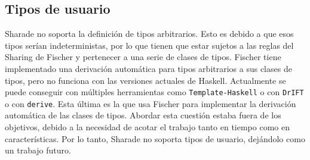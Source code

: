 \documentclass[class=article, crop=false]{standalone}
\begin{document}
\subsection{Tipos de usuario}

Sharade no soporta la definición de tipos arbitrarios. Esto es debido a que esos tipos serían
indeterministas, por lo que tienen que estar sujetos a las reglas del Sharing de Fischer y
pertenecer a una serie de clases de tipos. Fischer tiene implementado una derivación
automática para tipos arbitrarios a sus clases de tipos, pero no funciona con las versiones
actuales de Haskell. Actualmente se puede conseguir con múltiples herramientas como
\verb`Template-Haskell`\cite{sheard2002template} o con
\verb`DrIFT`\cite{DrIFT} o con \verb`derive`\cite{derive}. Esta última es la que usa Fischer
para implementar la derivación automática de las clases de tipos. Abordar esta cuestión
estaba fuera de los objetivos, debido a la necesidad de acotar el trabajo tanto en tiempo
como en características. Por lo tanto, Sharade no soporta tipos de usuario, dejándolo como un
trabajo futuro.
\end{document}
